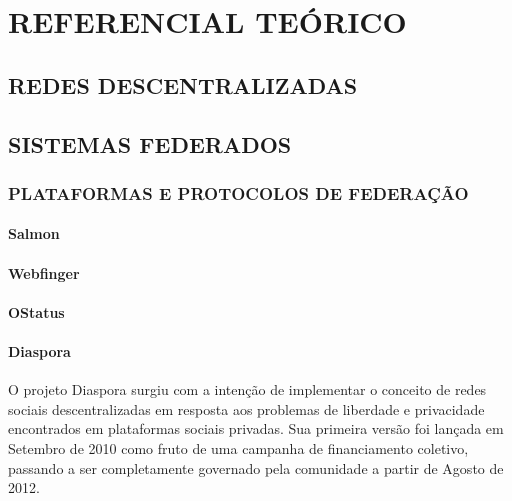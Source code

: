 \part{REFERENCIAL TEÓRICO}

\chapter{REDES DESCENTRALIZADAS}


\chapter{SISTEMAS FEDERADOS}


\section{PLATAFORMAS E PROTOCOLOS DE FEDERAÇÃO}




\subsection{Salmon}

\subsection{Webfinger}

\subsection{OStatus}

\subsection{Diaspora}

O projeto Diaspora surgiu com a intenção de implementar o conceito de redes sociais
descentralizadas em resposta aos problemas de liberdade e privacidade encontrados
em plataformas sociais privadas. Sua primeira versão foi lançada em Setembro de 2010
como fruto de uma campanha de financiamento coletivo, passando a ser completamente
governado pela comunidade a partir de Agosto de 2012.

